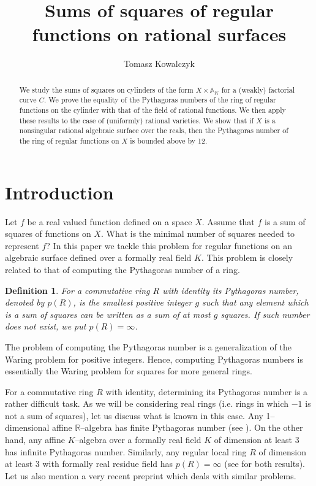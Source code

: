 \documentclass[12pt,reqno]{amsart}   	%
\title{Sums of squares of regular functions on rational surfaces}
\author{Tomasz  Kowalczyk}
\date{}
\newtheorem{df}[thm]{Definition}
\theoremstyle{obs}
\theoremstyle{prob}
\theoremstyle{conj}
\theoremstyle{remark}
\newcommand{\R}{\mathbb{R}}
\begin{document}
\maketitle



\begin{abstract}
We study the sums of squares on cylinders of the form $X \times \mathbb{A}_K$ for a (weakly) factorial curve $C$. We prove the equality of the Pythagoras numbers of the ring of regular functions on the cylinder with that of the field of rational functions. We then apply these results to the case of (uniformly) rational varieties. We show that if $X$ is a nonsingular rational algebraic surface over the reals, then the Pythagoras number of the ring of regular functions on $X$ is bounded above by 12.

\end{abstract}


\section*{Introduction}


 Let $f$ be a real valued function defined on a space $X$. Assume that $f$ is a sum of squares of functions on $X$. What is the minimal number of squares needed to represent $f$? In this paper we tackle this problem for regular functions on an algebraic surface defined over a formally real field $K$. This problem is closely related to that of computing the Pythagoras number of a ring.


 \begin{df}
For a commutative ring $R$ with identity its Pythagoras number, denoted by $p(R)$, is the smallest positive integer $g$ such that any element which is a sum of squares can be written as a sum of at most $g$ squares. If such number does not exist, we put $p(R)=\infty$.
\end{df}

The problem of computing the Pythagoras number is a generalization of the Waring problem for positive integers. Hence, computing Pythagoras numbers is essentially the Waring problem for squares for more general rings.

 
For a commutative ring $R$ with identity, determining its Pythagoras number is a rather difficult task. As we will be considering real rings (i.e. rings in which $-1$ is not a sum of squares), let us discuss what is known in this case. Any 1--dimensional affine $\R$--algebra has finite Pythagoras number (see \cite{cldr1982}). On the other hand, any affine $K$--algebra over a formally real field $K$ of dimension at least 3 has infinite Pythagoras number. Similarly, any regular local ring $R$ of dimension at least 3 with formally real residue field has $p(R)=\infty$ (see \cite{cldr1982} for both results). Let us also mention a very recent preprint \cite{osz2025} which deals with similar problems.
\end{document}
